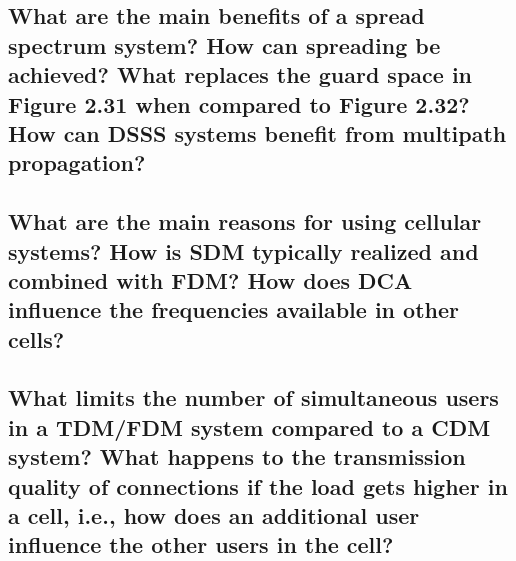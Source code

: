 \subsection{What are the main benefits of a spread spectrum system? How can spreading be
achieved? What replaces the guard space in Figure 2.31 when compared to Figure
2.32? How can DSSS systems benefit from multipath propagation?}

\subsection{What are the main reasons for using cellular systems? How is SDM typically realized
and combined with FDM? How does DCA influence the frequencies available in other
cells?}

\subsection{What limits the number of simultaneous users in a TDM/FDM system compared to a
CDM system? What happens to the transmission quality of connections if the load
gets higher in a cell, i.e., how does an additional user influence the other users in the
cell?}



